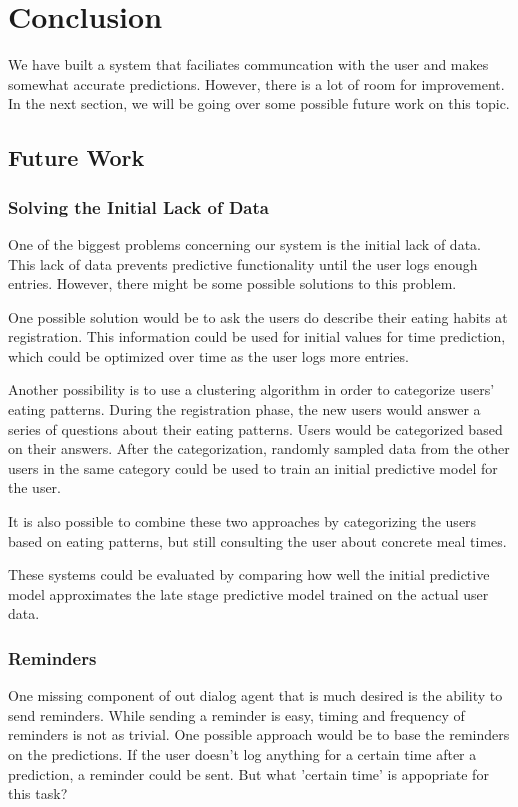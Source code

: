 
\chapter{Conclusion}\label{chapter:conclusion}
We have built a system that faciliates communcation with the user and makes somewhat accurate predictions.
However, there is a lot of room for improvement.
In the next section, we will be going over some possible future work on this topic.
\section{Future Work}
\subsection{Solving the Initial Lack of Data}
One of the biggest problems concerning our system is the initial lack of data.
This lack of data prevents predictive functionality until the user logs enough entries.
However, there might be some possible solutions to this problem.

One possible solution would be to ask the users do describe their eating habits at registration.
This information could be used for initial values for time prediction, which could be optimized over time as the user logs more entries.

Another possibility is to use a clustering algorithm in order to categorize users' eating patterns.
During the registration phase, the new users would answer a series of questions about their eating patterns.
Users would be categorized based on their answers.
After the categorization, randomly sampled data from the other users in the same category could be used to train an initial predictive model for the user.

It is also possible to combine these two approaches by categorizing the users based on eating patterns, but still consulting the user about concrete meal times.

These systems could be evaluated by comparing how well the initial predictive model approximates the late stage predictive model trained on the actual user data.

\subsection{Reminders}
One missing component of out dialog agent that is much desired is the ability to send reminders.
While sending a reminder is easy, timing and frequency of reminders is not as trivial.
One possible approach would be to base the reminders on the predictions.
If the user doesn't log anything for a certain time after a prediction, a reminder could be sent.
But what 'certain time' is appopriate for this task?

